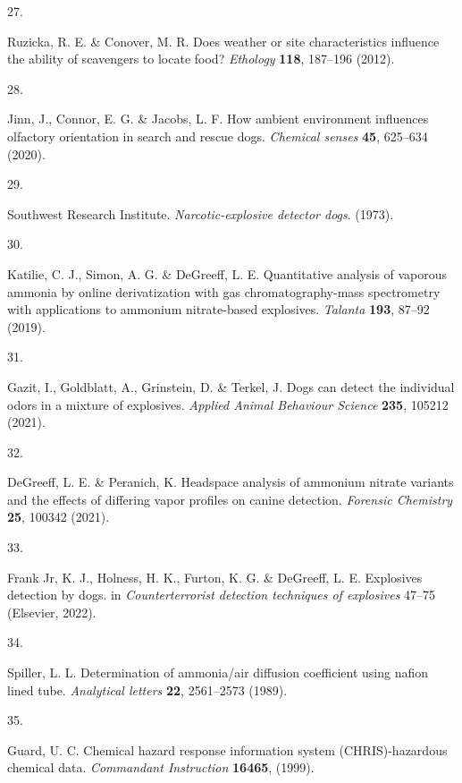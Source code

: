 \documentclass[
]{article}
\newlength{\cslhangindent}
\newlength{\csllabelwidth}
\newlength{\cslentryspacingunit} %
\newenvironment{CSLReferences}[2] %
 {%
  \setlength{\parindent}{0pt}
  \ifodd #1
  \let\oldpar\par
  \def\par{\hangindent=\cslhangindent\oldpar}
  \fi
  \setlength{\parskip}{#2\cslentryspacingunit}
 }%
 {}
\newcommand{\CSLLeftMargin}[1]{\parbox[t]{\csllabelwidth}{#1}}
\newcommand{\CSLRightInline}[1]{\parbox[t]{\linewidth - \csllabelwidth}{#1}\break}
\begin{document}
\begin{CSLReferences}{0}{0}
\leavevmode{}%
\CSLLeftMargin{27. }%
\CSLRightInline{Ruzicka, R. E. \& Conover, M. R. Does weather or site characteristics influence the ability of scavengers to locate food? \emph{Ethology} \textbf{118}, 187--196 (2012).}

\leavevmode{}%
\CSLLeftMargin{28. }%
\CSLRightInline{Jinn, J., Connor, E. G. \& Jacobs, L. F. How ambient environment influences olfactory orientation in search and rescue dogs. \emph{Chemical senses} \textbf{45}, 625--634 (2020).}

\leavevmode{}%
\CSLLeftMargin{29. }%
\CSLRightInline{Southwest Research Institute. \emph{Narcotic-explosive detector dogs}. (1973).}

\leavevmode{}%
\CSLLeftMargin{30. }%
\CSLRightInline{Katilie, C. J., Simon, A. G. \& DeGreeff, L. E. Quantitative analysis of vaporous ammonia by online derivatization with gas chromatography-mass spectrometry with applications to ammonium nitrate-based explosives. \emph{Talanta} \textbf{193}, 87--92 (2019).}

\leavevmode{}%
\CSLLeftMargin{31. }%
\CSLRightInline{Gazit, I., Goldblatt, A., Grinstein, D. \& Terkel, J. Dogs can detect the individual odors in a mixture of explosives. \emph{Applied Animal Behaviour Science} \textbf{235}, 105212 (2021).}

\leavevmode{}%
\CSLLeftMargin{32. }%
\CSLRightInline{DeGreeff, L. E. \& Peranich, K. Headspace analysis of ammonium nitrate variants and the effects of differing vapor profiles on canine detection. \emph{Forensic Chemistry} \textbf{25}, 100342 (2021).}

\leavevmode{}%
\CSLLeftMargin{33. }%
\CSLRightInline{Frank Jr, K. J., Holness, H. K., Furton, K. G. \& DeGreeff, L. E. Explosives detection by dogs. in \emph{Counterterrorist detection techniques of explosives} 47--75 (Elsevier, 2022).}

\leavevmode{}%
\CSLLeftMargin{34. }%
\CSLRightInline{Spiller, L. L. Determination of ammonia/air diffusion coefficient using nafion lined tube. \emph{Analytical letters} \textbf{22}, 2561--2573 (1989).}

\leavevmode{}%
\CSLLeftMargin{35. }%
\CSLRightInline{Guard, U. C. Chemical hazard response information system (CHRIS)-hazardous chemical data. \emph{Commandant Instruction} \textbf{16465}, (1999).}


\end{CSLReferences}
\end{document}
